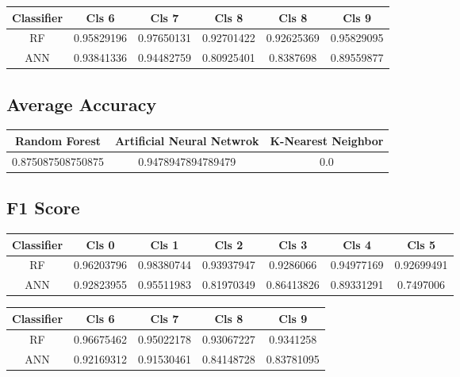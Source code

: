 \documentclass[12pt,a4paper]{article}
\begin{document}
\begin{center}
\begin{tabular}{ || c c c c c c || } 
\hline
Classifier & Cls 6 & Cls 7 & Cls 8 & Cls 8 & Cls 9\\
 \hline
 RF & 0.95829196 & 0.97650131 & 0.92701422 & 0.92625369 & 0.95829095\\ 
\hline
ANN & 0.93841336 & 0.94482759 & 0.80925401 & 0.8387698 & 0.89559877\\
 \hline
\end{tabular}
\end{center}

\subsection{Average Accuracy}
\begin{center}
\begin{tabular}{ || c c c || } 
\hline
Random Forest & Artificial Neural Netwrok & K-Nearest Neighbor\\
\hline
0.875087508750875 & 0.9478947894789479 & 0.0\\
 \hline
\end{tabular}
\end{center}

\subsection{F1 Score}
\begin{center}
\begin{tabular}{ || c c c c c c c|| } 
\hline
Classifier & Cls 0 & Cls 1 & Cls 2 & Cls 3 & Cls 4 & Cls 5\\
 \hline
 RF & 0.96203796 & 0.98380744 & 0.93937947 & 0.9286066 & 0.94977169 & 0.92699491\\ 
\hline
ANN & 0.92823955 & 0.95511983 & 0.81970349 & 0.86413826 & 0.89331291 & 0.7497006\\
 \hline
\end{tabular}
\end{center}

\begin{center}
\begin{tabular}{ || c c c c  c || } 
\hline
Classifier & Cls 6 & Cls 7 & Cls 8  & Cls 9\\
 \hline
 RF & 0.96675462 & 0.95022178 & 0.93067227 & 0.9341258\\ 
\hline
ANN & 0.92169312 & 0.91530461 & 0.84148728 & 0.83781095\\
 \hline
\end{tabular}
\end{center}
\end{document}
